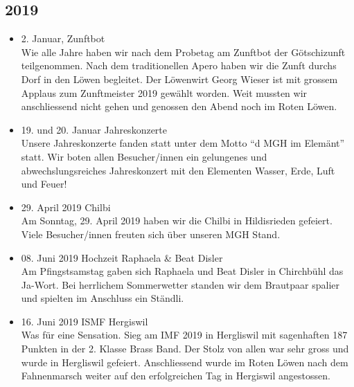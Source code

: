 \subsection*{2019}
\begin{history}

    \begin{itemize}

        \item 2. Januar, Zunftbot\\
              Wie alle Jahre haben wir nach dem Probetag am Zunftbot der
              Götschizunft teilgenommen. Nach dem traditionellen Apero haben wir
              die Zunft durchs Dorf in den Löwen begleitet. Der Löwenwirt Georg
              Wieser ist mit grossem Applaus zum Zunftmeister 2019 gewählt
              worden. Weit mussten wir anschliessend nicht gehen und genossen
              den Abend noch im Roten Löwen.

        \item 19. und 20. Januar Jahreskonzerte\\
              Unsere Jahreskonzerte fanden statt unter dem Motto \enquote{d MGH
                  im Elemänt} statt. Wir boten allen Besucher/innen ein
              gelungenes und abwechslungsreiches Jahreskonzert mit den
              Elementen Wasser, Erde, Luft und Feuer!

        \item 29. April 2019 Chilbi\\
              Am Sonntag, 29. April 2019 haben wir die Chilbi in Hildisrieden
              gefeiert. Viele Besucher/innen freuten sich über unseren MGH
              Stand.

        \item 08. Juni 2019 Hochzeit Raphaela & Beat Disler\\
              Am Pfingstsamstag gaben sich Raphaela und Beat Disler in
              Chirchbühl das Ja-Wort. Bei herrlichem Sommerwetter standen wir
              dem Brautpaar spalier und spielten im Anschluss ein Ständli.

        \item 16. Juni 2019 ISMF Hergiswil\\
              Was für eine Sensation. Sieg am IMF 2019 in Hergliswil mit
              sagenhaften 187 Punkten in der 2. Klasse Brass Band. Der Stolz von
              allen war sehr gross und wurde in Hergliswil gefeiert.
              Anschliessend wurde im Roten Löwen nach dem Fahnenmarsch weiter
              auf den erfolgreichen Tag in Hergiswil angestossen.


\end{itemize}
\end{history}

